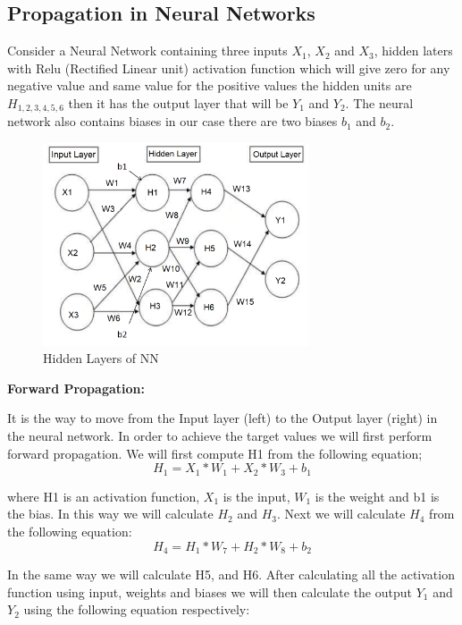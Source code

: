 \subsection{Propagation in Neural Networks}
Consider a Neural Network containing three inputs $X_{1}$, $X_{2}$ and $X_{3}$, hidden laters with Relu (Rectified Linear unit) activation function which will give zero for any negative value and same value for the positive values the hidden units are $H_{1,2,3,4,5,6}$ then it has the output layer that will be $Y_{1}$ and $Y_{2}$. The neural network also contains biases in our case there are two biases $b_{1}$ and $b_{2}$.

\begin{figure}[h!]
    \centering
    \includegraphics[width=0.7\textwidth]{img/propagation.png}
    \caption{Hidden Layers of NN}
    \label{fig:nn-hiddenlayer}
\end{figure}

\textbf{Forward Propagation:}

It is the way to move from the Input layer (left) to the Output layer (right) in the neural network. In order to achieve the target values we will first perform forward propagation. We will first compute H1 from the following equation;
\begin{equation}
H_{1}=X_{1}*W_{1}+X_{2}*W_{3}+b_{1}    
\end{equation}

where H1 is an activation function, $X_{1}$ is the input, $W_{1}$ is the weight and b1 is the bias. In this way we will calculate $H_{2}$ and $H_{3}$. Next we will calculate $H_{4}$ from the following equation:
\begin{equation}
H_{4}=H_{1}*W_{7}+H_{2}*W_{8}+b_{2}    
\end{equation}

In the same way we will calculate H5, and H6. After calculating all the activation function using input, weights and biases we will then calculate the output $Y_{1}$ and $Y_{2}$ using the following equation respectively:

